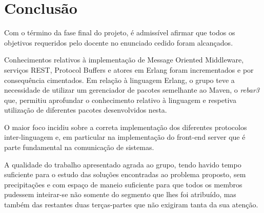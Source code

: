 \documentclass[a4paper,12pt]{article}
\begin{document}
\section{Conclusão}
Com o término da fase final do projeto, é admissível afirmar que todos os objetivos requeridos pelo docente no enunciado cedido foram alcançados.
\par Conhecimentos relativos à implementação de Message Oriented Middleware, serviços REST, Protocol Buffers e atores em Erlang foram incrementados e por consequência cimentados. Em relação à linguagem Erlang, o grupo teve a necessidade de utilizar um gerenciador de pacotes semelhante ao Maven, o \textit{rebar3} que, permitiu aprofundar o conhecimento relativo à linguagem e respetiva utilização de diferentes pacotes desenvolvidos nesta.
\par O maior foco incidiu sobre a correta implementação dos diferentes protocolos inter-linguagem e, em particular na implementação do front-end server que é parte fundamental na comunicação de sistemas.
\par A qualidade do trabalho apresentado agrada ao grupo, tendo havido tempo suficiente para o estudo das soluções encontradas ao problema proposto, sem precipitações e com espaço de maneio suficiente para que todos os membros pudessem inteirar-se não somente do segmento que lhes foi atribuído, mas também das restantes duas terças-partes que não exigiram tanta da sua atenção.
\end{document}
